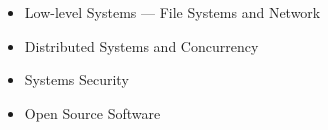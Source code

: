 
{\fontsize{9pt}{1em}\bodyfont\upshape\color{text}
\begin{itemize}[leftmargin=12pt]
    \setlength\itemsep{-3pt}
    \item Low-level Systems --- File Systems and Network
    \item Distributed Systems and Concurrency
    \item Systems Security
    \item Open Source Software
\end{itemize}
}
